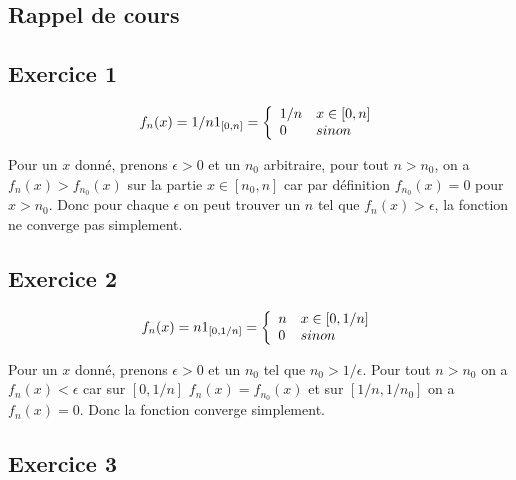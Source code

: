 \documentclass[]{book}
\theoremstyle{definition}
\begin{document}
\subsection*{Rappel de cours}

\newpage

\subsection*{Exercice 1}

$$
f_n(x) = 1/n 1_{[0, n]} = 
\left\{
\begin{array}{l l}
1/n & x \in [0,n] \\
0 & sinon
\end{array}
\right.
$$

Pour un $x$ donn\'e, prenons $\epsilon > 0$ et un $n_0$ arbitraire, pour tout $n > n_0$, on a $f_n(x) > f_{n_0}(x)$ sur la partie $x \in [n_0, n]$ car par d\'efinition $f_{n_0}(x) = 0$ pour $x > n_0$. Donc pour chaque $\epsilon$ on peut trouver un $n$ tel que $f_n(x) > \epsilon$, la fonction ne converge pas simplement.


\subsection*{Exercice 2}


$$
f_n(x) = n 1_{[0, 1/n]} = 
\left\{
\begin{array}{l l}
n & x \in [0,1/n] \\
0 & sinon
\end{array}
\right.
$$

Pour un $x$ donn\'e, prenons $\epsilon > 0$ et un $n_0$ tel que $n_0 > 1/\epsilon$. Pour tout $n > n_0$ on a $f_n(x) < \epsilon$ car sur $[0,1/n]$ $f_n(x) = f_{n_0}(x)$ et sur $[1/n,1/n_0]$ on a $f_n(x) = 0$. 	 
Donc la fonction converge simplement.

\subsection*{Exercice 3}

\end{document}
